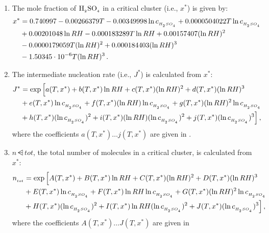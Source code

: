 \begin{enumerate}
  \item The mole fraction of $\rm H_{_2}SO_{_4}$ in a critical cluster (i.e., $x^*$) is
        given by:
    \begin{align}
      x^* &= 0.740997 - 0.00266379 T - 0.00349998 \ln c_{_{H_{_2}SO_{_4}}}
             + 0.0000504022 T \ln c_{_{H_{_2}SO_{_4}}} \nonumber \\
          &+ 0.00201048 \ln RH - 0.000183289 T \ln RH
             + 0.00157407 (\ln RH)^2 \nonumber \\
          &- 0.0000179059 T (\ln RH)^2 + 0.000184403 (\ln RH)^3 \nonumber \\
          &- 1.50345 \cdot 10^{-6} T (\ln RH)^3 \,.
    \end{align}
  \item The intermediate nucleation rate (i.e., $J^*$) is calculated from
        $x^*$:
        \begin{align}
          J^* &= \exp \Big[ a(T,x^*) + b(T,x^*) \ln RH +
                 c(T,x^*) (\ln RH)^2 + d(T,x^*) (\ln RH)^3 \nonumber \\
              &+ e(T,x^*) \ln c\dsub{\sag} + f(T,x^*) (\ln RH) \ln c\dsub{\sag}
                 + g(T,x^*) (\ln RH)^2 \ln c\dsub{\sag} \nonumber \\
              &+ h(T,x^*) (\ln c\dsub{\sag})^2 + i(T,x^*) (\ln RH)
                (\ln c\dsub{\sag})^2 + j(T,x^*) (\ln c\dsub{\sag})^3 \Big] \,, \labeleq{vk2002_nucrate}
        \end{align}
        where the coefficients $a(T,x^*) \dots j(T,x^*)$ are given in
        .
  \item $n\dsub{tot}$, the total number of molecules in a critical cluster,
        is calculated from $x^*$:
        \begin{align}
          n\dsub{tot} &= \exp \Big[ A(T,x^*) + B(T,x^*) \ln RH
                         + C(T,x^*) (\ln RH)^2 + D(T,x^*) (\ln RH)^3 \nonumber \\
                      &+ E(T,x^*) \ln c\dsub{\sag} + F(T,x^*) \ln RH \ln c\dsub{\sag}
                         + G(T,x^*) (\ln RH)^2 \ln c\dsub{\sag} \nonumber \\
                      &+ H(T,x^*) (\ln c\dsub{\sag})^2
                       + I(T,x^*) \ln RH (\ln c\dsub{\sag})^2
                       + J(T,x^*) (\ln c\dsub{\sag})^3 \Big] \,, \labeleq{vk2002_ntot}
        \end{align}
        where the coefficients $A(T,x^*) \dots J(T,x^*)$ are given in

\end{enumerate}
